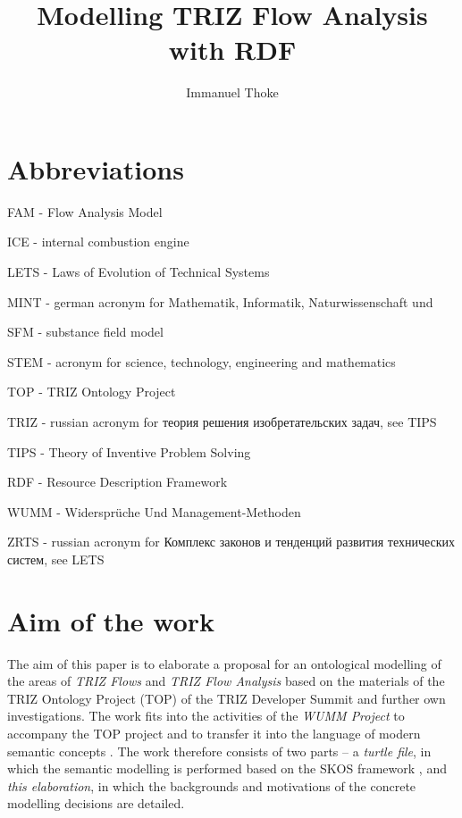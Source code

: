 \documentclass[a4paper,11pt]{article}
\author{Immanuel Thoke}
\title{Modelling TRIZ Flow Analysis with RDF}
\begin{document}
    \maketitle
    \tableofcontents
    \newpage
    \section{Abbreviations}
    FAM - Flow Analysis Model

    ICE - internal combustion engine

    LETS - Laws of Evolution of Technical Systems

    MINT - german acronym for Mathematik, Informatik, Naturwissenschaft und 
    
    SFM - substance field model

    STEM - acronym for science, technology, engineering and mathematics

    TOP - TRIZ Ontology Project

    TRIZ - russian acronym for \foreignlanguage{russian}{теория решения изобретательских задач}, see TIPS

    TIPS - Theory of Inventive Problem Solving 

    RDF - Resource Description Framework 

    WUMM - Widersprüche Und Management-Methoden

    ZRTS - russian acronym for \foreignlanguage{russian}{Комплекс законов и тенденций развития технических систем}, see LETS

    \newpage

    \section{Aim of the work}

    The aim of this paper is to elaborate a proposal for an ontological modelling
    of the areas of \emph{TRIZ Flows} and \emph{TRIZ Flow Analysis} based on the
    materials of the TRIZ Ontology Project (TOP) of the TRIZ Developer Summit
    \cite{TOP} and further own investigations. The work fits into the activities
    of the \emph{WUMM Project} \cite{WUMM} to accompany the TOP project and to
    transfer it into the language of modern semantic concepts
    \cite{WUMMTOP}.  The work therefore consists of two parts -- a
    \emph{turtle file}, in which the semantic modelling is performed based on the
    SKOS framework \cite{SKOS}, and \emph{this elaboration}, in which the
    backgrounds and motivations of the concrete modelling decisions are detailed.
\end{document}
